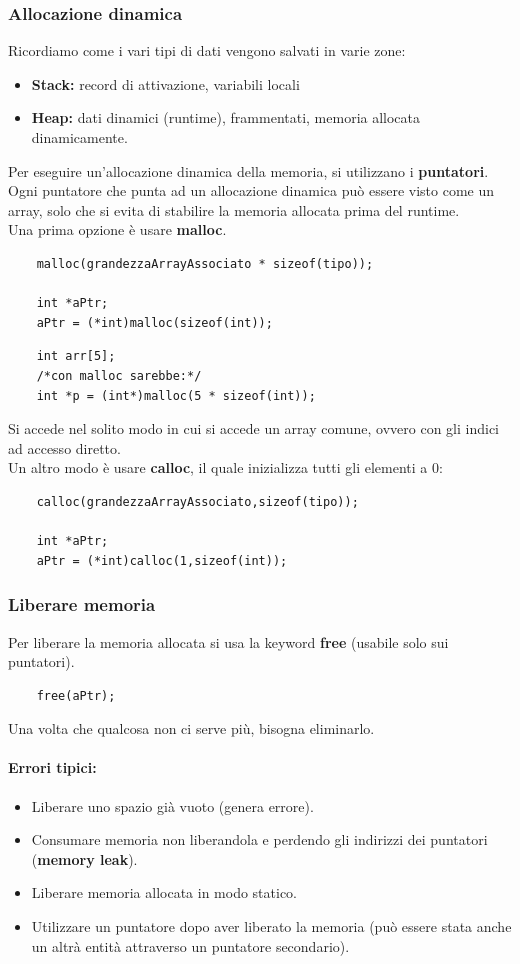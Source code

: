 \documentclass[12pt,a4paper]{article}
\begin{document}
\subsubsection{Allocazione dinamica}
Ricordiamo come i vari tipi di dati vengono salvati in varie zone:
\begin{itemize}
    \item \textbf{Stack:} record di attivazione, variabili locali
    \item \textbf{Heap:} dati dinamici (runtime), frammentati, memoria allocata dinamicamente.
\end{itemize}
Per eseguire un'allocazione dinamica della memoria, si utilizzano i \textbf{puntatori}.\\
Ogni puntatore che punta ad un allocazione dinamica può essere visto come un array, solo che si evita di stabilire la memoria allocata prima del runtime.\\
Una prima opzione è usare \textbf{malloc}. 
\begin{lstlisting}
    malloc(grandezzaArrayAssociato * sizeof(tipo));

    int *aPtr;
    aPtr = (*int)malloc(sizeof(int));
\end{lstlisting}
\begin{lstlisting}
    int arr[5];
    /*con malloc sarebbe:*/
    int *p = (int*)malloc(5 * sizeof(int));
\end{lstlisting}
Si accede nel solito modo in cui si accede un array comune, ovvero con gli indici ad accesso diretto.\\
Un altro modo è usare \textbf{calloc}, il quale inizializza tutti gli elementi a 0:
\begin{lstlisting}
    calloc(grandezzaArrayAssociato,sizeof(tipo));

    int *aPtr;
    aPtr = (*int)calloc(1,sizeof(int));
\end{lstlisting}

\subsubsection{Liberare memoria}
Per liberare la memoria allocata si usa la keyword \textbf{free} (usabile solo sui puntatori).\\
\begin{lstlisting}
    free(aPtr);
\end{lstlisting}
Una volta che qualcosa non ci serve più, bisogna eliminarlo.\\
\paragraph{Errori tipici:}
\begin{itemize}
    \item Liberare uno spazio già vuoto (genera errore).
    \item Consumare memoria non liberandola e perdendo gli indirizzi dei puntatori (\textbf{memory leak}).
    \item Liberare memoria allocata in modo statico.
    \item Utilizzare un puntatore dopo aver liberato la memoria (può essere stata anche un altrà entità attraverso un puntatore secondario).
\end{itemize}
\end{document}
